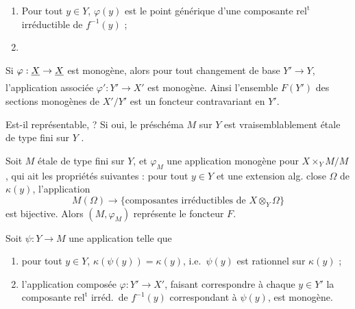 \documentclass[11pt,a4paper]{article}
\begin{document}
\begin{enumerate}
\item[(ii)] Pour tout $y \in Y$, $\varphi(y)$ est le point générique d'une
composante $\mathrm{rel}^{\mathrm{t}}$ irréductible de $f^{-1}(y)$ ;
\item[(iii)] \ill{}
\end{enumerate}



Si $\varphi : \struck{X} \to \struck{X}$ est monogène, alors pour tout
changement de base $Y' \to Y$, l'application associée $\varphi' : Y' \to X'$
 est monogène. Ainsi l'ensemble $F(Y')$ des
sections monogènes de $X'/Y'$ est un foncteur contravariant en $Y'$.

Est-il représentable, \ill{} ? Si oui, le préschéma  $M$ sur $Y$ est
vraisemblablement étale de type fini sur $Y$ .

Soit $M$ étale de type fini sur $Y$, et $\varphi_M$ une 
application monogène pour $X \times_Y M / M$, qui ait les propriétés suivantes :
pour tout $y \in Y$ et une extension alg. close $\Omega$ de $\kappa(y)$,
l'application
\[
  M(\Omega) \longrightarrow \{\text{composantes irréductibles de } X \otimes_Y \Omega\}
\]
est bijective. Alors $(M, \varphi_M)$ représente le foncteur $F$.



 Soit $\psi : Y \to M$ une application telle
que

\begin{enumerate}
\item[(i)] pour tout $y \in Y$, $\kappa(\psi(y)) = \kappa(y)$, i.e.\ $\psi(y)$
est rationnel sur $\kappa(y)$ ;
\item[(ii)] l'application composée $\varphi : Y' \to X'$, \struck{\ill{}}
faisant correspondre à chaque $y \in Y'$ la composante
$\mathrm{rel}^{\mathrm{t}}$ irréd.\ de $f^{-1}(y)$ correspondant  à $\psi(y)$, est monogène.
\end{enumerate}
\end{document}
